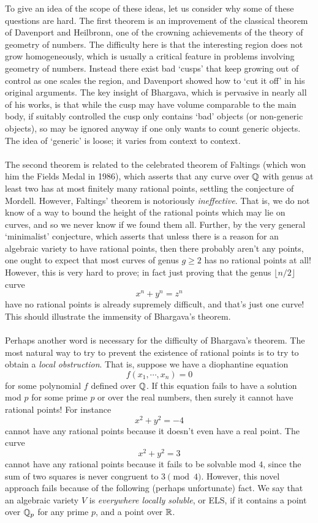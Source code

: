 \documentclass[12pt,amsfont]{amsart}
\begin{document}
To give an idea of the scope of these ideas, let us consider why some of these questions are hard. The first theorem is an improvement of the classical theorem of Davenport and Heilbronn, one of the crowning achievements of the theory of geometry of numbers. The difficulty here is that the interesting region does not grow homogeneously, which is usually a critical feature in problems involving geometry of numbers. Instead there exist bad `cusps' that keep growing out of control as one scales the region, and Davenport showed how to `cut it off' in his original arguments. The key insight of Bhargava, which is pervasive in nearly all of his works, is that while the cusp may have volume comparable to the main body, if suitably controlled the cusp only contains `bad' objects (or non-generic objects), so may be ignored anyway if one only wants to count generic objects. The idea of `generic' is loose; it varies from context to context. \\ \\
The second theorem is related to the celebrated theorem of Faltings (which won him the Fields Medal in 1986), which asserts that any curve over ${\mathbb Q}$ with genus at least two has at most finitely many rational points, settling the conjecture of Mordell. However, Faltings' theorem is notoriously \emph{ineffective}. That is, we do not know of a way to bound the height of the rational points which may lie on curves, and so we never know if we found them all. Further, by the very general `minimalist' conjecture, which asserts that unless there is a reason for an algebraic variety to have rational points, then there probably aren't any points, one ought to expect that most curves of genus $g \geq 2$ has no rational points at all! However, this is very hard to prove; in fact just proving that the genus $\lfloor n/2 \rfloor$ curve
\[x^n + y^n = z^n\]
have no rational points is already supremely difficult, and that's just one curve! This should illustrate the immensity of Bhargava's theorem. \\ \\
Perhaps another word is necessary for the difficulty of Bhargava's theorem. The most natural way to try to prevent the existence of rational points is to try to obtain a \emph{local obstruction}. That is, suppose we have a diophantine equation
\[f(x_1, \cdots, x_n) = 0\]
for some polynomial $f$ defined over ${\mathbb Q}$. If this equation fails to have a solution mod $p$ for some prime $p$ or over the real numbers, then surely it cannot have rational points! For instance
\[x^2 + y^2 = -4\]
cannot have any rational points because it doesn't even have a real point. The curve
\[x^2 + y^2 = 3\]
cannot have any rational points because it fails to be solvable mod $4$, since the sum of two squares is never congruent to $3 \pmod{4}$. However, this novel approach fails because of the following (perhaps unfortunate) fact. We say that an algebraic variety $V$ is \emph{everywhere locally soluble}, or ELS, if it contains a point over ${\mathbb Q}_p$ for any prime $p$, and a point over ${\mathbb R}$. 
\end{document}

